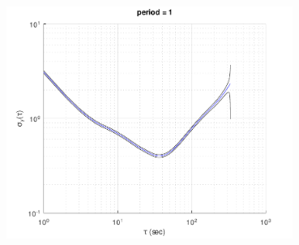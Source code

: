 \begin{center}
\includegraphics[width=0.7\textwidth]{algs_examples_published/MADEV_alg_example-1.pdf}
\end{center}


\stopcontents[localtoc]
